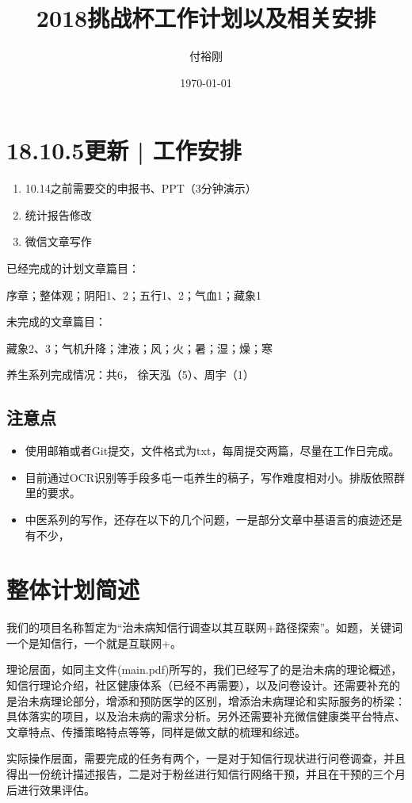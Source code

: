 \documentclass{article}
\title{2018挑战杯工作计划以及相关安排}
\author{付裕刚}
\date{\today}
\begin{document}
    \maketitle
    \section*{18.10.5更新 | 工作安排}
    \begin{enumerate}
        \item 10.14之前需要交的申报书、PPT（3分钟演示）
        \item 统计报告修改
        \item 微信文章写作
    \end{enumerate}

    已经完成的计划文章篇目：
    
    序章；整体观；阴阳1、2；五行1、2；气血1；藏象1
    
    未完成的文章篇目：
    
    藏象2、3；气机升降；津液；风；火；暑；湿；燥；寒
    
    养生系列完成情况：共6， 徐天泓（5）、周宇（1）
    \subsection{注意点}
    \begin{itemize}
        \item 使用邮箱或者Git提交，文件格式为txt，每周提交两篇，尽量在工作日完成。
        \item 目前通过OCR识别等手段多屯一屯养生的稿子，写作难度相对小。排版依照群里的要求。
        \item 中医系列的写作，还存在以下的几个问题，一是部分文章中基语言的痕迹还是有不少，
    \end{itemize}
    \section{整体计划简述}
    我们的项目名称暂定为“治未病知信行调查以其互联网+路径探索”。如题，关键词一个是知信行，一个就是互联网+。
    
    理论层面，如同主文件(main.pdf)所写的，我们已经写了的是治未病的理论概述，知信行理论介绍，社区健康体系（已经不再需要），以及问卷设计。还需要补充的是治未病理论部分，增添和预防医学的区别，增添治未病理论和实际服务的桥梁：具体落实的项目，以及治未病的需求分析。另外还需要补充微信健康类平台特点、文章特点、传播策略特点等等，同样是做文献的梳理和综述。
    
    实际操作层面，需要完成的任务有两个，一是对于知信行现状进行问卷调查，并且得出一份统计描述报告，二是对于粉丝进行知信行网络干预，并且在干预的三个月后进行效果评估。
    
\end{document}
